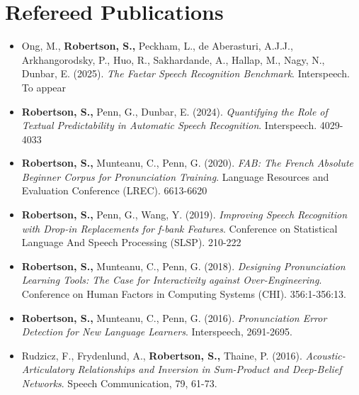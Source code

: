 \documentclass[11pt,a4paper,sans]{moderncv}        %
\begin{document}
\pagebreak

\section{Refereed Publications}
\begin{itemize}
  \item Ong, M., \textbf{Robertson, S.,} Peckham, L., de Aberasturi, A.J.J.,
    Arkhangorodsky, P., Huo, R., Sakhardande, A., Hallap, M., Nagy, N., Dunbar, E. (2025).
    \textit{The Faetar Speech Recognition Benchmark}. Interspeech. To appear
    
  \item \textbf{Robertson, S.,} Penn, G., Dunbar, E. (2024).
    \textit{Quantifying the Role of Textual Predictability in Automatic Speech
    Recognition}. Interspeech. 4029-4033

  \item \textbf{Robertson, S.,} Munteanu, C., Penn, G. (2020).
    \textit{FAB: The French Absolute Beginner Corpus for Pronunciation
    Training}. Language Resources and Evaluation Conference (LREC). 6613-6620

  \item \textbf{Robertson, S.,} Penn, G., Wang, Y. (2019).
    \textit{Improving Speech Recognition with Drop-in Replacements for f-bank
    Features}. Conference on Statistical Language And Speech Processing
    (SLSP). 210-222

  \item \textbf{Robertson, S.,} Munteanu, C., Penn, G. (2018).
    \textit{Designing Pronunciation Learning Tools: The Case for Interactivity
    against Over-Engineering}. Conference on Human Factors in Computing Systems
    (CHI). 356:1-356:13.

  \item \textbf{Robertson, S.,} Munteanu, C., Penn, G. (2016).
    \textit{Pronunciation Error Detection for New Language Learners}.
    Interspeech, 2691-2695.

  \item Rudzicz, F., Frydenlund, A., \textbf{Robertson, S.,} Thaine, P. (2016).
    \textit{Acoustic-Articulatory Relationships and Inversion in Sum-Product
    and Deep-Belief Networks}. Speech Communication, 79, 61-73.
\end{itemize}
\end{document}

